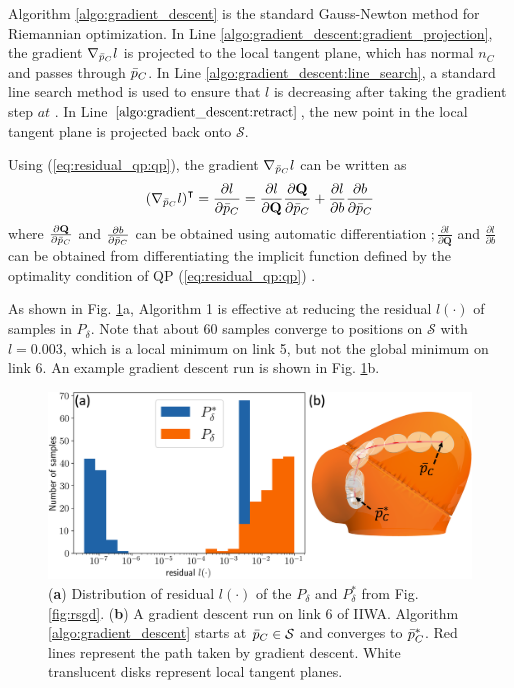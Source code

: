 Algorithm \ref{algo:gradient_descent} is the standard Gauss-Newton method for Riemannian optimization. In Line \ref{algo:gradient_descent:gradient_projection}, the gradient $\nabla_{\bar{p}_C} l$ is projected to the local tangent plane, which has normal ${n}_C$ and passes through $\bar{p}_C$. In Line \ref{algo:gradient_descent:line_search}, a standard line search method is used to ensure that $l$ is decreasing after taking the gradient step $a{t}$ \cite{boyd2004convex}. In Line $\ref{algo:gradient_descent:retract}$, the new point in the local tangent plane is projected back onto $\mathcal{S}$.

Using (\ref{eq:residual_qp:qp}), the gradient $\nabla_{\bar{p}_C} l$ can be written as 
\begin{equation}
\label{eq:l_gradient_chain_rule}
\left(\nabla_{\bar{p}_C} l \right)^\intercal =
\frac{\partial l}{\partial \bar{p}_C} = \frac{\partial l}{\partial \mathbf{Q}} \frac{\partial \mathbf{Q}}{\partial \bar{p}_C} + \frac{\partial l}{\partial {b}} \frac{\partial {b}}{\partial \bar{p}_C}
\end{equation}
where $\frac{\partial \mathbf{Q}}{\partial \bar{p}_C}$ and $\frac{\partial {b}}{\partial \bar{p}_C}$ can be obtained using automatic differentiation \cite{griewank1989automatic}$; \frac{\partial l}{\partial \mathbf{Q}}$ and $\frac{\partial l}{\partial {b}}$ can be obtained from differentiating the implicit function defined by the optimality condition of QP (\ref{eq:residual_qp:qp}) \cite{boot1963sensitivity}.

As shown in Fig. \ref{fig:gradient_descent}a, Algorithm 1 is effective at reducing the residual $l(\cdot)$ of samples in $P_\delta$. Note that about 60 samples converge to positions on $\mathcal{S}$ with $l = 0.003$, which is a local minimum on link 5, but not the global minimum on link 6. An example gradient descent run is shown in Fig. \ref{fig:gradient_descent}b.
\begin{figure}[h]
\centering
\includegraphics[width=0.85\linewidth]{figures/05_force_from_torque/gradient_descent.png}
\caption{(\textbf{a}) Distribution of residual $l(\cdot)$ of the $P_\delta$ and $P_\delta^*$ from Fig. \ref{fig:rsgd}. (\textbf{b}) A gradient descent run on link 6 of IIWA. Algorithm \ref{algo:gradient_descent} starts at $\bar{p}_C \in \mathcal{S}$ and converges to $\bar{p}_C^*$. Red lines represent the path taken by gradient descent. White translucent disks represent local tangent planes. }
\label{fig:gradient_descent}
\vspace{-1.0cm}
\end{figure}

